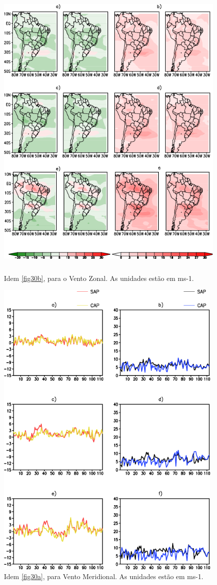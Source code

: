 \begin{figure}[!hbp]
\centering
\includegraphics[height=15cm]{./figs/campo_vies_eqm-uvel.png}
\caption{Idem \autoref{fig30b}, para o Vento Zonal. As unidades estão em ms-1.}
\label{fig32b}
\end{figure}

\begin{figure}[!hbp]
\centering
\includegraphics[height=15cm]{./figs/vies_eqm-vvel.png}
\caption{Idem \autoref{fig30a}, para Vento Meridional. As unidades estão em ms-1.}
\label{fig33a}
\end{figure}

